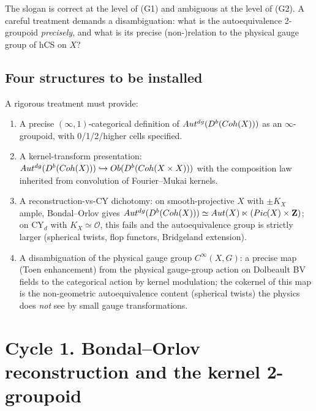 \documentclass[11pt]{amsart}
\theoremstyle{definition}
\providecommand{\Coh}{\mathrm{Coh}}
\providecommand{\Aut}{\mathrm{Aut}}
\providecommand{\Autdg}{\mathrm{Aut}^{\rm dg}}
\providecommand{\Pic}{\mathrm{Pic}}
\providecommand{\Ob}{\mathrm{Ob}}
\providecommand{\cO}{\mathcal{O}}
\providecommand{\bZ}{\mathbf{Z}}
\begin{document}
The slogan is correct at the level of (G1) and ambiguous at the level
of (G2). A careful treatment demands a disambiguation: what is the
autoequivalence 2-groupoid \emph{precisely}, and what is its precise
(non-)relation to the physical gauge group of hCS on $X$?

\subsection{Four structures to be installed}

A rigorous treatment must provide:

\begin{enumerate}[label=(S\arabic*)]
 \item A precise $(\infty,1)$-categorical definition of
   $\Autdg(D^b(\Coh(X)))$ as an $\infty$-groupoid, with 0/1/2/higher
   cells specified.
 \item A kernel-transform presentation:
   $\Autdg(D^b(\Coh(X))) \hookrightarrow \Ob(D^b(\Coh(X \times X)))$
   with the composition law inherited from convolution of
   Fourier--Mukai kernels.
 \item A reconstruction-vs-CY dichotomy: on smooth-projective $X$
   with $\pm K_X$ ample, Bondal--Orlov gives
   $\Autdg(D^b(\Coh(X))) \simeq \Aut(X) \ltimes (\Pic(X) \times \bZ)$;
   on CY$_d$ with $K_X \simeq \cO$, this fails and the autoequivalence
   group is strictly larger (spherical twists, flop functors,
   Bridgeland extension).
 \item A disambiguation of the physical gauge group $C^\infty(X, G)$:
   a precise map (Toen enhancement) from the physical gauge-group
   action on Dolbeault BV fields to the categorical action by kernel
   modulation; the cokernel of this map is the non-geometric
   autoequivalence content (spherical twists) the physics does
   \emph{not} see by small gauge transformations.
\end{enumerate}

\section{Cycle 1. Bondal--Orlov reconstruction and the kernel
2-groupoid}
\label{sec:cycle-BO}
\end{document}
